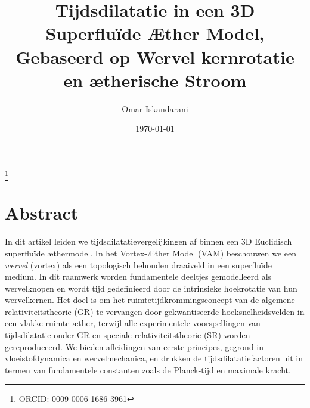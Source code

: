 \documentclass[a4paper,12pt]{revtex4}
\begin{document}
\author{Omar Iskandarani}
\title{Tijdsdilatatie in een 3D Superfluïde Æther Model, Gebaseerd op Wervel kernrotatie en ætherische Stroom}
\date{\today}
\thanks{ORCID: \href{https://orcid.org/0009-0006-1686-3961}{0009-0006-1686-3961}}

\maketitle

\section*{Abstract}
In dit artikel leiden we tijdsdilatatievergelijkingen af binnen een 3D Euclidisch superfluïde æthermodel. In het Vortex-Æther Model (VAM) beschouwen we een \textit{wervel} (vortex) als een topologisch behouden draaiveld in een superfluïde medium. In dit raamwerk worden fundamentele deeltjes gemodelleerd als wervelknopen en wordt tijd gedefinieerd door de intrinsieke hoekrotatie van hun wervelkernen. Het doel is om het ruimtetijdkrommingsconcept van de algemene relativiteitstheorie (GR) te vervangen door gekwantiseerde hoeksnelheidsvelden in een vlakke-ruimte-æther, terwijl alle experimentele voorspellingen van tijdsdilatatie onder GR en speciale relativiteitstheorie (SR) worden gereproduceerd. We bieden afleidingen van eerste principes, gegrond in vloeistofdynamica en wervelmechanica, en drukken de tijdsdilatatiefactoren uit in termen van fundamentele constanten zoals de Planck-tijd en maximale kracht.




\end{document}

